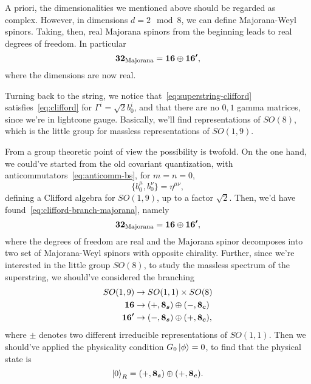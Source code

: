 \begin{mdframed}
A priori, the dimensionalities we mentioned above should be regarded as complex. However, in dimensions $d = 2 \mod 8$, we can define Majorana-Weyl spinors. Taking, then, real Majorana spinors from the beginning leads to real degrees of freedom. In particular
\begin{equation}\label{eq:clifford-branch-majorana}
    \boldsymbol{32}_\textup{Majorana} = \boldsymbol{16} \oplus \boldsymbol{16'},
\end{equation}
where the dimensions are now real.
\end{mdframed}

Turning back to the string, we notice that~\eqref{eq:superstring-clifford} satisfies~\eqref{eq:clifford} for $\Gamma^i = \sqrt{2} b^i_0$, and that there are no $0,1$ gamma matrices, since we're in lightcone gauge. Basically, we'll find representations of $SO(8)$, which is the little group for massless representations of $SO(1,9)$.

From a group theoretic point of view the possibility is twofold. On the one hand, we could've started from the old covariant quantization, with anticommutators~\eqref{eq:anticomm-bs}, for $m=n=0$,
\begin{equation}
    \{ b^\mu_0, b^\nu_0 \} = \eta^{\mu\nu},
\end{equation}
defining a Clifford algebra for $SO(1,9)$, up to a factor $\sqrt{2}$. Then, we'd have found~\eqref{eq:clifford-branch-majorana}, namely
\begin{equation}
    \boldsymbol{32}_\textup{Majorana} = \boldsymbol{16} \oplus \boldsymbol{16'} ,
\end{equation}
where the degrees of freedom are real and the Majorana spinor decomposes into two set of Majorana-Weyl spinors with opposite chirality. Further, since we're interested in the little group $SO(8)$, to study the massless spectrum of the superstring, we should've considered the branching
\begin{equation}
\begin{aligned}
    SO(1,9) &\to SO(1,1) \times SO(8) \\
    \boldsymbol{16} &\to (+,\boldsymbol{8_s}) \oplus (-,\boldsymbol{8_c}) \\
    \boldsymbol{16'} &\to (-,\boldsymbol{8_s}) \oplus (+,\boldsymbol{8_c}) ,
\end{aligned}
\end{equation}
where $\pm$ denotes two different irreducible representations of $SO(1,1)$. Then we should've applied the physicality condition $G_0\ket{\phi}=0$, to find that the physical state is
\begin{equation}
    \ket{0}_{R} = (+,\boldsymbol{8_s}) \oplus (+,\boldsymbol{8_c}) .
\end{equation}

